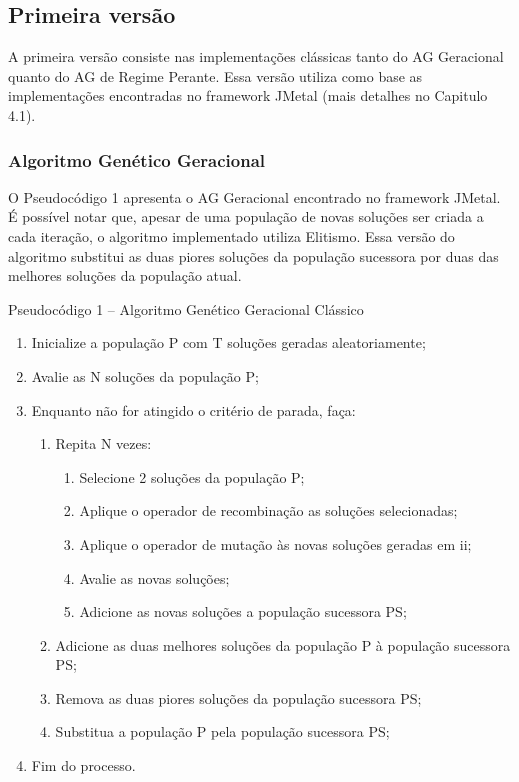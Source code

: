 \subsection{Primeira versão}

A primeira versão consiste nas implementações clássicas tanto do AG Geracional quanto do AG de Regime Perante. Essa versão utiliza como base as implementações encontradas no framework JMetal (mais detalhes no Capitulo 4.1).

\subsubsection{Algoritmo Genético Geracional}

O Pseudocódigo 1 apresenta o AG Geracional encontrado no framework JMetal. É possível notar que, apesar de uma população de novas soluções ser criada a cada iteração, o algoritmo implementado utiliza Elitismo. Essa versão do algoritmo substitui as duas piores soluções da população sucessora por duas das melhores soluções da população atual.

Pseudocódigo 1 – Algoritmo Genético Geracional Clássico 

\begin{enumerate}
\item Inicialize a população P com T soluções geradas aleatoriamente;
\item Avalie as N soluções da população P;
\item Enquanto não for atingido o critério de parada, faça:

\begin{enumerate}
\item Repita N vezes:

\begin{enumerate}
\item Selecione 2 soluções da população P;
\item Aplique o operador de recombinação as soluções selecionadas;
\item Aplique o operador de mutação às novas soluções geradas em ii;
\item Avalie as novas soluções;
\item Adicione as novas soluções a população sucessora PS;
\end{enumerate}

\item Adicione as duas melhores soluções da população P à população sucessora PS;
\item Remova as duas piores soluções da população sucessora PS;
\item Substitua a população P pela população sucessora PS;
\end{enumerate}
\item Fim do processo.

\end{enumerate}

